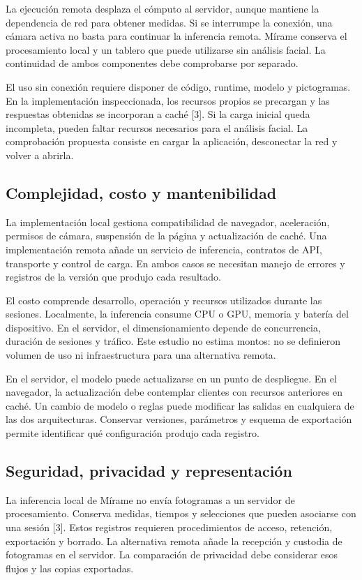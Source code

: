 \documentclass[conference,letterpaper]{IEEEtran}
\begin{document}
La ejecución remota desplaza el cómputo al servidor, aunque mantiene la dependencia de red para obtener medidas. Si se interrumpe la conexión, una cámara activa no basta para continuar la inferencia remota. Mírame conserva el procesamiento local y un tablero que puede utilizarse sin análisis facial. La continuidad de ambos componentes debe comprobarse por separado.

El uso sin conexión requiere disponer de código, runtime, modelo y pictogramas. En la implementación inspeccionada, los recursos propios se precargan y las respuestas obtenidas se incorporan a caché [3]. Si la carga inicial queda incompleta, pueden faltar recursos necesarios para el análisis facial. La comprobación propuesta consiste en cargar la aplicación, desconectar la red y volver a abrirla.


\subsection{Complejidad, costo y mantenibilidad}
La implementación local gestiona compatibilidad de navegador, aceleración, permisos de cámara, suspensión de la página y actualización de caché. Una implementación remota añade un servicio de inferencia, contratos de API, transporte y control de carga. En ambos casos se necesitan manejo de errores y registros de la versión que produjo cada resultado.

El costo comprende desarrollo, operación y recursos utilizados durante las sesiones. Localmente, la inferencia consume CPU o GPU, memoria y batería del dispositivo. En el servidor, el dimensionamiento depende de concurrencia, duración de sesiones y tráfico. Este estudio no estima montos: no se definieron volumen de uso ni infraestructura para una alternativa remota.

En el servidor, el modelo puede actualizarse en un punto de despliegue. En el navegador, la actualización debe contemplar clientes con recursos anteriores en caché. Un cambio de modelo o reglas puede modificar las salidas en cualquiera de las dos arquitecturas. Conservar versiones, parámetros y esquema de exportación permite identificar qué configuración produjo cada registro.


\subsection{Seguridad, privacidad y representación}
La inferencia local de Mírame no envía fotogramas a un servidor de procesamiento. Conserva medidas, tiempos y selecciones que pueden asociarse con una sesión [3]. Estos registros requieren procedimientos de acceso, retención, exportación y borrado. La alternativa remota añade la recepción y custodia de fotogramas en el servidor. La comparación de privacidad debe considerar esos flujos y las copias exportadas.
\end{document}
